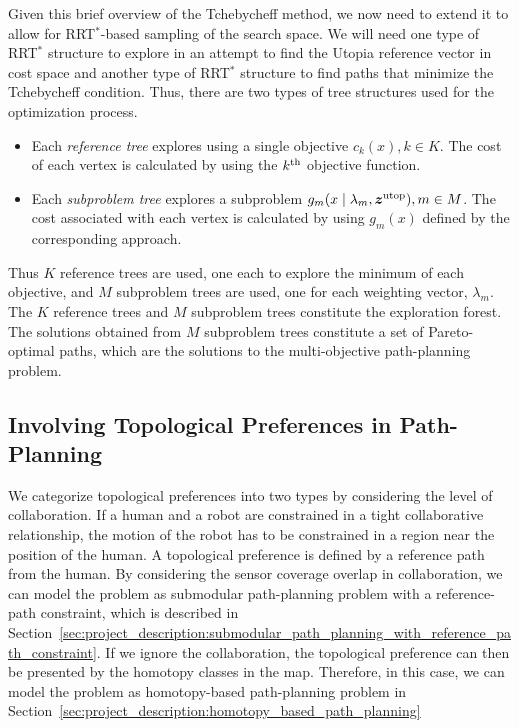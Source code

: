 \documentclass[phd]{byuprop}
\begin{document}
Given this brief overview of the Tchebycheff method, we now need to extend it to allow for RRT$^{*}$-based sampling of the search space.  
We will need one type of RRT$^{*}$ structure to explore in an attempt to find the Utopia reference vector in cost space and another type of RRT$^{*}$ structure to find paths that minimize the Tchebycheff condition. %
Thus, there are two types of tree structures used for the optimization process.
\begin{itemize}
	\item Each \emph{reference tree} explores using a single objective $ c_{k} (x), k \in K $. 
	The cost of each vertex is calculated by using the $ k^{\rm th} $ objective function.
	\item Each \emph{subproblem tree} explores a subproblem $ g_{m} ( x \mid \lambda_{m} , \bm{z}^{\rm utop} ) , m \in M $.
	The cost associated with each vertex is calculated by using $ g_{m}(x) $ defined by the corresponding approach.
\end{itemize}
Thus $ K $ reference trees are used, one each to explore the minimum of each objective, and $ M $ subproblem trees are used, one for each weighting vector, $ \lambda_{m} $.  
The $K$ reference trees and $M$ subproblem trees constitute the exploration forest.
The solutions obtained from $ M $ subproblem trees constitute a set of Pareto-optimal paths, which are the solutions to the multi-objective path-planning problem. 

\subsection{Involving Topological Preferences in Path-Planning}
\label{sec:project_description:involving_topological_preferences_in_path_planning}

We categorize topological preferences into two types by considering the level of collaboration.
If a human and a robot are constrained in a tight collaborative relationship, the motion of the robot has to be constrained in a region near the position of the human.
A topological preference is defined by a reference path from the human.
By considering the sensor coverage overlap in collaboration, we can model the problem as submodular path-planning problem with a reference-path constraint, which is described in Section~\ref{sec:project_description:submodular_path_planning_with_reference_path_constraint}.
If we ignore the collaboration, the topological preference can then be presented by the homotopy classes in the map.
Therefore, in this case, we can model the problem as homotopy-based path-planning problem in Section~\ref{sec:project_description:homotopy_based_path_planning} 
\end{document}
